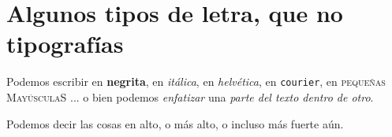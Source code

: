 \chapter{Algunos tipos de letra, que no tipografías}

Podemos escribir en  \textbf{negrita}, en \textit{itálica}, en \textsl{helvética}, en \texttt{courier}, en \textsc{pequeñas MayúsculaS} ... o bien podemos \emph{enfatizar} una \textit{parte del texto \emph{dentro} de otro}.

Podemos decir las cosas en {\large alto}, o más {\Large alto}, o incluso {\huge más} fuerte {\Huge aún}.
